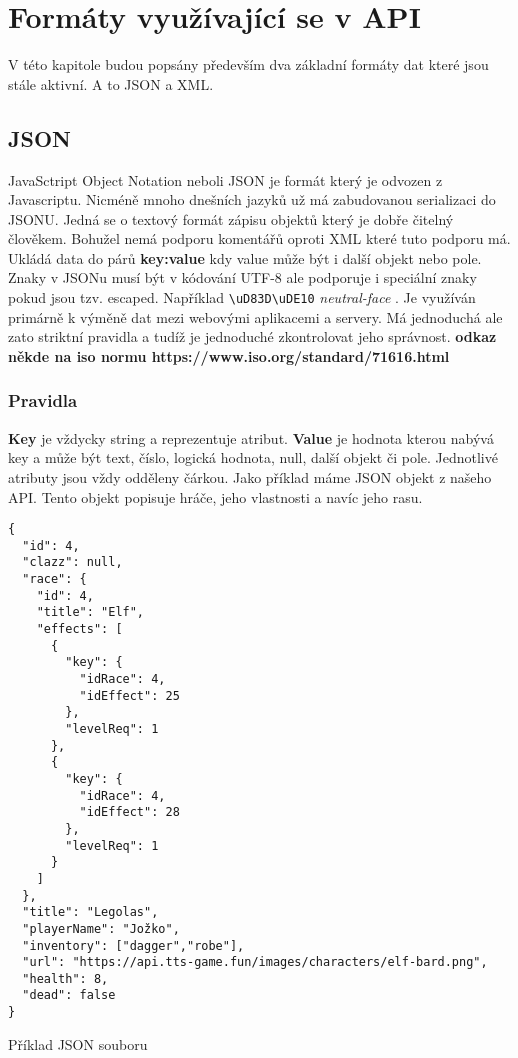 \chapter{Formáty využívající se v API}
V této kapitole budou popsány především dva základní formáty dat které jsou stále aktivní. A to JSON a XML.

\section{JSON}
JavaSctript Object Notation neboli JSON je formát který je odvozen z Javascriptu. Nicméně mnoho dnešních jazyků už má zabudovanou serializaci do JSONU. Jedná se o textový formát zápisu objektů který je dobře čitelný člověkem. Bohužel nemá podporu komentářů oproti XML které tuto podporu má. Ukládá data do párů \textbf{key:value} kdy value může být i další objekt nebo pole. Znaky v JSONu musí být v kódování UTF-8 ale podporuje i speciální znaky pokud jsou tzv. escaped. Například \verb |\uD83D\uDE10| \textit{neutral-face} . Je využíván primárně k výměně dat mezi webovými aplikacemi a  servery. Má jednoduchá ale zato striktní pravidla a tudíž je jednoduché zkontrolovat jeho správnost. \textbf{odkaz někde na iso normu https://www.iso.org/standard/71616.html} %


\subsection{Pravidla}
\textbf{Key} je vždycky string a reprezentuje atribut. \textbf{Value} je hodnota kterou nabývá key a může být text, číslo, logická hodnota, null, další objekt či pole. Jednotlivé atributy jsou vždy odděleny čárkou. Jako příklad máme JSON objekt z našeho API. Tento objekt popisuje hráče, jeho vlastnosti a navíc jeho rasu.

\newpage

\begin{listing}
  \begin{verbatim}
{
  "id": 4,
  "clazz": null,
  "race": {
    "id": 4,
    "title": "Elf",
    "effects": [
      {
        "key": {
          "idRace": 4,
          "idEffect": 25
        },
        "levelReq": 1
      },
      {
        "key": {
          "idRace": 4,
          "idEffect": 28
        },
        "levelReq": 1
      }
    ]
  },
  "title": "Legolas",
  "playerName": "Jožko",
  "inventory": ["dagger","robe"],
  "url": "https://api.tts-game.fun/images/characters/elf-bard.png",
  "health": 8,
  "dead": false
}
  \end{verbatim}
  \caption{Příklad JSON souboru}
  \label{code:sumaradyasm}
\end{listing}

